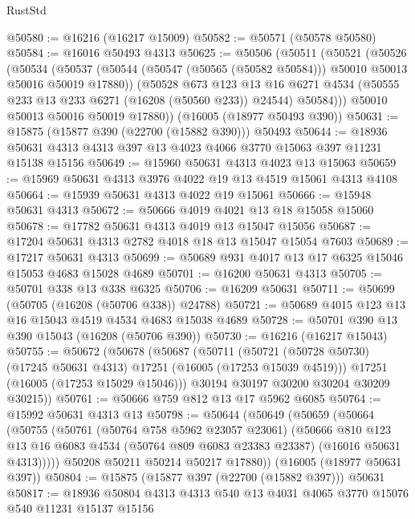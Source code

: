 \begin{lexlean}{RustStd}
\begin{coremodule}
@50580 := @16216 (@16217 @15009)
@50582 := @50571 (@50578 @50580)
@50584 := @16016 @50493 @4313
@50625 := @50506
    (@50511
      (@50521
        (@50526
          (@50534
            (@50537 (@50544 (@50547 (@50565 (@50582 @50584))) @50010 @50013 @50016 @50019 @17880))
            (@50528
              @673
              @123
              @13
              @16
              @6271
              @4534
              (@50555 @233 @13 @233 @6271 (@16208 (@50560 @233)) @24544)
              @50584)))
        @50010
        @50013
        @50016
        @50019
        @17880))
    (@16005 (@18977 @50493 @390))
@50631 := @15875 (@15877 @390 (@22700 (@15882 @390))) @50493
@50644 := @18936 @50631 @4313 @4313 @397 @13 @4023 @4066 @3770 @15063 @397 @11231 @15138 @15156
@50649 := @15960 @50631 @4313 @4023 @13 @15063
@50659 := @15969 @50631 @4313 @3976 @4022 @19 @13 @4519 @15061 @4313 @4108
@50664 := @15939 @50631 @4313 @4022 @19 @15061
@50666 := @15948 @50631 @4313
@50672 := @50666 @4019 @4021 @13 @18 @15058 @15060
@50678 := @17782 @50631 @4313 @4019 @13 @15047 @15056
@50687 := @17204 @50631 @4313 @2782 @4018 @18 @13 @15047 @15054 @7603
@50689 := @17217 @50631 @4313
@50699 := @50689 @931 @4017 @13 @17 @6325 @15046 @15053 @4683 @15028 @4689
@50701 := @16200 @50631 @4313
@50705 := @50701 @338 @13 @338 @6325
@50706 := @16209 @50631
@50711 := @50699 (@50705 (@16208 (@50706 @338)) @24788)
@50721 := @50689 @4015 @123 @13 @16 @15043 @4519 @4534 @4683 @15038 @4689
@50728 := @50701 @390 @13 @390 @15043 (@16208 (@50706 @390))
@50730 := @16216 (@16217 @15043)
@50755 := @50672
    (@50678
      (@50687
        (@50711
          (@50721 (@50728 @50730) (@17245 @50631 @4313) @17251 (@16005 (@17253 @15039 @4519)))
          @17251
          (@16005 (@17253 @15029 @15046)))
        @30194
        @30197
        @30200
        @30204
        @30209
        @30215))
@50761 := @50666 @759 @812 @13 @17 @5962 @6085
@50764 := @15992 @50631 @4313 @13
@50798 := @50644
    (@50649
      (@50659
        (@50664
          (@50755
            (@50761
              (@50764 @758 @5962 @23057 @23061)
              (@50666
                @810
                @123
                @13
                @16
                @6083
                @4534
                (@50764 @809 @6083 @23383 @23387)
                (@16016 @50631 @4313)))))
        @50208
        @50211
        @50214
        @50217
        @17880))
    (@16005 (@18977 @50631 @397))
@50804 := @15875 (@15877 @397 (@22700 (@15882 @397))) @50631
@50817 := @18936 @50804 @4313 @4313 @540 @13 @4031 @4065 @3770 @15076 @540 @11231 @15137 @15156

\end{coremodule}
\end{lexlean}
